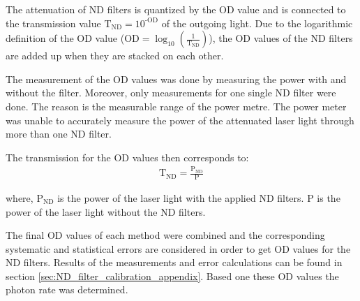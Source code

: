 The attenuation of ND filters is quantized by the OD value and is connected to the transmission value $ \text{T}_{\text{ND}} = 10^{\text{-OD}}$ of the outgoing light.
Due to the logarithmic definition of the OD value ($\text{OD} = \log_{10}(\frac{1}{\text{T}_{\text{ND}}})$), the OD values of the
ND filters are added up when they are stacked on each other.

The measurement of the OD values was done by measuring the power with and without the filter.
Moreover, only measurements for one single ND filter were done.
The reason is the measurable range of the power metre.
The power meter was unable to accurately measure the power of the attenuated laser light through more than one ND filter.

The transmission for the OD values then corresponds to:
\begin{align}
    \text{T}_{\text{ND}} = \frac{\text{P}_{\text{ND}}}{\text{P}}
\end{align}

where, $\text{P}_{\text{ND}}$ is the power of the laser light with the applied ND filters.
$\text{P}$ is the power of the laser light without the ND filters.

The final OD values of each method were combined and the corresponding systematic and statistical errors are
considered in order to get OD values for the ND filters.
Results of the measurements and error calculations can be found in section \ref{sec:ND_filter_calibration_appendix}.
Based one these OD values the photon rate was determined.







%

\FloatBarrier

